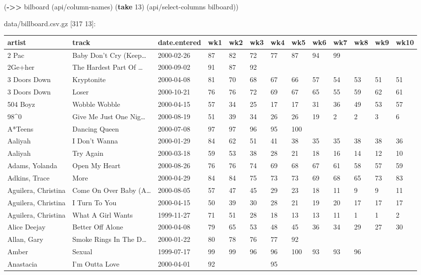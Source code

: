 \documentclass[]{article}
\newenvironment{Shaded}{\begin{snugshade}}{\end{snugshade}}
\newcommand{\KeywordTok}[1]{\textcolor[rgb]{0.13,0.29,0.53}{\textbf{#1}}}
\newcommand{\DecValTok}[1]{\textcolor[rgb]{0.00,0.00,0.81}{#1}}
\newcommand{\NormalTok}[1]{#1}
\begin{document}
\begin{Shaded}
\begin{Highlighting}[]
\NormalTok{(}\KeywordTok{->>}\NormalTok{ bilboard}
\NormalTok{     (api/column-names)}
\NormalTok{     (}\KeywordTok{take} \DecValTok{13}\NormalTok{)}
\NormalTok{     (api/select-columns bilboard))}
\end{Highlighting}
\end{Shaded}

data/billboard.csv.gz {[}317 13{]}:

\begin{longtable}[]{@{}lllllllllllll@{}}
\toprule
artist & track & date.entered & wk1 & wk2 & wk3 & wk4 & wk5 & wk6 & wk7
& wk8 & wk9 & wk10\tabularnewline
\midrule
\endhead
2 Pac & Baby Don't Cry (Keep\ldots{} & 2000-02-26 & 87 & 82 & 72 & 77 &
87 & 94 & 99 & & &\tabularnewline
2Ge+her & The Hardest Part Of \ldots{} & 2000-09-02 & 91 & 87 & 92 & & &
& & & &\tabularnewline
3 Doors Down & Kryptonite & 2000-04-08 & 81 & 70 & 68 & 67 & 66 & 57 &
54 & 53 & 51 & 51\tabularnewline
3 Doors Down & Loser & 2000-10-21 & 76 & 76 & 72 & 69 & 67 & 65 & 55 &
59 & 62 & 61\tabularnewline
504 Boyz & Wobble Wobble & 2000-04-15 & 57 & 34 & 25 & 17 & 17 & 31 & 36
& 49 & 53 & 57\tabularnewline
98\^{}0 & Give Me Just One Nig\ldots{} & 2000-08-19 & 51 & 39 & 34 & 26
& 26 & 19 & 2 & 2 & 3 & 6\tabularnewline
A*Teens & Dancing Queen & 2000-07-08 & 97 & 97 & 96 & 95 & 100 & & & &
&\tabularnewline
Aaliyah & I Don't Wanna & 2000-01-29 & 84 & 62 & 51 & 41 & 38 & 35 & 35
& 38 & 38 & 36\tabularnewline
Aaliyah & Try Again & 2000-03-18 & 59 & 53 & 38 & 28 & 21 & 18 & 16 & 14
& 12 & 10\tabularnewline
Adams, Yolanda & Open My Heart & 2000-08-26 & 76 & 76 & 74 & 69 & 68 &
67 & 61 & 58 & 57 & 59\tabularnewline
Adkins, Trace & More & 2000-04-29 & 84 & 84 & 75 & 73 & 73 & 69 & 68 &
65 & 73 & 83\tabularnewline
Aguilera, Christina & Come On Over Baby (A\ldots{} & 2000-08-05 & 57 &
47 & 45 & 29 & 23 & 18 & 11 & 9 & 9 & 11\tabularnewline
Aguilera, Christina & I Turn To You & 2000-04-15 & 50 & 39 & 30 & 28 &
21 & 19 & 20 & 17 & 17 & 17\tabularnewline
Aguilera, Christina & What A Girl Wants & 1999-11-27 & 71 & 51 & 28 & 18
& 13 & 13 & 11 & 1 & 1 & 2\tabularnewline
Alice Deejay & Better Off Alone & 2000-04-08 & 79 & 65 & 53 & 48 & 45 &
36 & 34 & 29 & 27 & 30\tabularnewline
Allan, Gary & Smoke Rings In The D\ldots{} & 2000-01-22 & 80 & 78 & 76 &
77 & 92 & & & & &\tabularnewline
Amber & Sexual & 1999-07-17 & 99 & 99 & 96 & 96 & 100 & 93 & 93 & 96 &
&\tabularnewline
Anastacia & I'm Outta Love & 2000-04-01 & 92 & & & 95 & & & & &

\end{longtable}
\end{document}
